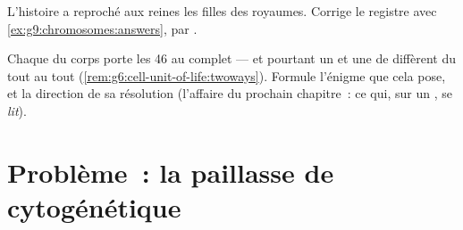 \begin{exercise}[$\star\star$]\label{exo:g9:chromosomes:11}
L'histoire a reproché aux reines les filles des royaumes.
Corrige le registre avec \cref{ex:g9:chromosomes:answers},
 par .
\end{exercise}

\begin{exercise}[$\star\star\star$]\label{exo:g9:chromosomes:12}
Chaque  du corps porte les 46 au complet --- et
pourtant un  et une  de  diffèrent du tout
au tout (\cref{rem:g6:cell-unit-of-life:twoways}). Formule
l'énigme que cela pose, et la direction de sa résolution
(l'affaire du prochain chapitre~: ce qui, sur un
, se \emph{lit}).
\end{exercise}

\section{Problème~: la paillasse de cytogénétique}

